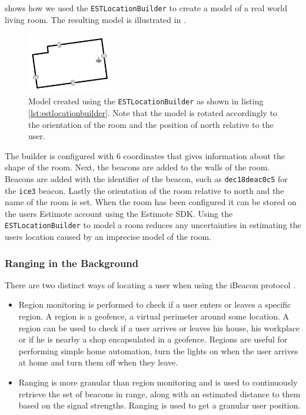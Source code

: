  shows how we used the \texttt{ESTLocationBuilder} to create a model of a real world living room. 
The resulting model is illustrated in .

\begin{figure}[!htb]
  \centering
  \includegraphics[width=0.33\textwidth]{images/living-room}
  \caption{Model created using the \texttt{ESTLocationBuilder} as shown in listing \ref{lst:estlocationbuilder}. Note that the model is rotated accordingly to the orientation of the room and the position of north relative to the user.}
  \label{fig:estlocationbuilder-livingroom}
\end{figure}

The builder is configured with $6$ coordinates that gives information about the shape of the room. 
Next, the beacons are added to the walls of the room. 
Beacons are added with the identifier of the beacon, such as \texttt{dec18deac0c5} for the \texttt{ice3} beacon. 
Lastly the orientation of the room relative to north and the name of the room is set. 
When the room has been configured it can be stored on the users Estimote account using the Estimote SDK.
Using the \texttt{ESTLocationBuilder} to model a room reduces any uncertainties in estimating the users location caused by an imprecise model of the room.

\subsubsection{Ranging in the Background}

There are two distinct ways of locating a user when using the iBeacon protocol \cite{estimote:monitoring-ranging}.

\begin{itemize}
\item Region monitoring is performed to check if a user enters or leaves a specific region. A region is a geofence, \ie a virtual perimeter around some location. A region can be used to check if a user arrives or leaves his house, his workplace or if he is nearby a shop encapsulated in a geofence. Regions are useful for performing simple home automation, \eg turn the lights on when the user arrives at home and turn them off when they leave.
\item Ranging is more granular than region monitoring and is used to continuously retrieve the set of beacons in range, along with an estimated distance to them based on the signal strengths. Ranging is used to get a granular user position.
\end{itemize}

